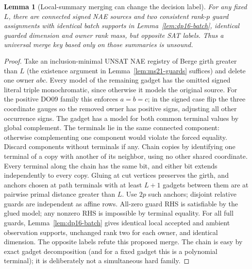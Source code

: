 \documentclass[11pt]{article}
\newtheorem{lemma}[theorem]{Lemma}
\begin{document}
\begin{lemma}[Local-summary merging can change the decision label]\label{lem:dp16-unsound}
For any fixed $L$, there are connected signed NAE sources and two consistent rank-$p$ guard assignments with identical batch supports in Lemma~\ref{lem:dp16-batch}, identical guarded dimension and owner rank mass, but opposite SAT labels. Thus a universal merge key based only on those summaries is unsound.
\end{lemma}
\begin{proof}
Take an inclusion-minimal UNSAT NAE registry of Berge girth greater than $L$ (the existence argument in Lemma~\ref{lem:ms21-guards} suffices) and delete one owner $abc$. Every model of the remaining gadget has the omitted signed literal triple monochromatic, since otherwise it models the original source. For the positive DO09 family this enforces $a=b=c$; in the signed case flip the three coordinate gauges so the removed owner has positive signs, adjusting all other occurrence signs. The gadget has a model for both common terminal values by global complement. The terminals lie in the same connected component: otherwise complementing one component would violate the forced equality. Discard components without terminals if any. Chain copies by identifying one terminal of a copy with another of its neighbor, using no other shared coordinate. Every terminal along the chain has the same bit, and either bit extends independently to every copy. Gluing at cut vertices preserves the girth, and anchors chosen at path terminals with at least $L+1$ gadgets between them are at pairwise primal distance greater than $L$. Use $2p$ such anchors; disjoint relative guards are independent as affine rows. All-zero guard RHS is satisfiable by the glued model; any nonzero RHS is impossible by terminal equality. For all full guards, Lemma~\ref{lem:dp16-batch} gives identical local accepted and ambient observation supports, unchanged rank two for each owner, and identical dimension. The opposite labels refute this proposed merge. The chain is easy by exact gadget decomposition (and for a fixed gadget this is a polynomial terminal); it is deliberately not a simultaneous hard family.
\end{proof}
\end{document}

